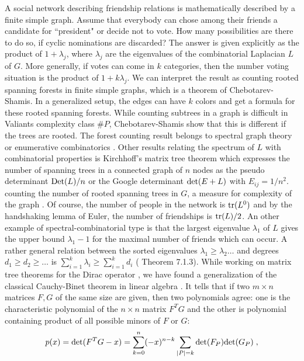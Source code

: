 \documentclass[12pt]{amsart}
\theoremstyle{definition}
\begin{document}
A social network describing friendship relations is mathematically described by 
a finite simple graph.  Assume that everybody can chose among their friends a candidate
for ``president" or decide not to vote. How many possibilities are there to do so, if 
cyclic nominations are discarded? The answer is given explicitly as the product of $1+\lambda_j$,
where $\lambda_j$ are the eigenvalues of the combinatorial Laplacian $L$ of $G$. More generally, 
if votes can come in $k$ categories, then the number voting situation is the product of
$1+k \lambda_j$. 
We can interpret the result as counting rooted spanning forests in finite simple graphs, which is 
a theorem of Chebotarev-Shamis. 
In a generalized setup, the edges can have $k$ colors and get a formula for these rooted spanning 
forests.  While counting subtrees in a graph is difficult 
\cite{Jerrum,GoldbergJerrum} in Valiants complexity class $\#P$, Chebotarev-Shamis show that this
is different if the trees are rooted. 
The forest counting result belongs to spectral graph theory \cite{Biggs,Chung97,CDS,Beineke,Knauer} 
or enumerative combinatorics \cite{HararyPalmer,Godsil}. 
Other results relating the spectrum of $L$ with combinatorial properties is
Kirchhoff's matrix tree theorem which expresses the number of spanning trees in a 
connected graph of $n$ nodes as the pseudo determinant ${\rm{Det}}(L)/n$ or the Google determinant
${{\rm det}}(E+L)$ with $E_{ij}=1/n^2$. 
counting the number of rooted spanning trees in $G$, a measure for complexity of the graph \cite{Biggs}.
Of course, the number of people in the network 
is ${\rm{tr}}(L^0)$ and by the handshaking lemma of Euler, the number of friendships is ${\rm{tr}}(L)/2$. 
An other example of spectral-combinatorial type is that the 
largest eigenvalue $\lambda_1$ of $L$ gives the upper bound $\lambda_1-1$ for the maximal 
number of friends which can occur. A rather general relation between the sorted eigenvalues 
$\lambda_1 \geq \lambda_2 \dots $ and degrees $d_1 \geq d_2 \geq \dots$ is 
$\sum_{i=1}^k \lambda_i \geq \sum_{i=1}^k d_i$ (\cite{CRS} Theorem 7.1.3).
While working on matrix tree theorems for the Dirac operator \cite{DiracKnill}, we have found a 
generalization of the classical Cauchy-Binet theorem in linear algebra \cite{cauchybinet}.
It tells that if two $m \times n$ matrices $F,G$ of the same size are given, then 
two polynomials agree: one is the characteristic polynomial of the $n \times n$ 
matrix $F^TG$ and the other is polynomial containing product of all possible minors of $F$ or $G$:
\begin{equation}
 p(x) = {{\rm det}}(F^T G-x) = \sum_{k=0}^n (-x)^{n-k} \sum_{|P|=k} {{\rm det}}(F_P) {{\rm det}}(G_P) \; ,
 \label{1}
\end{equation}
\end{document}
